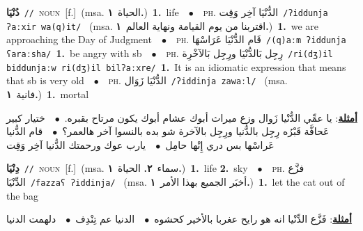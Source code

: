 \documentclass[10pt,a4paper,twoside]{article} %
\begin{document}
\begin{multicols}{2}
{\setlength\topsep{0pt}\textbf{\foreignlanguage{arabic}{دُنْيَا}}\ {\color{gray}\texttt{//}\color{black}}\ \textsc{noun}\ [f.]\ \color{gray}(msa. \foreignlanguage{arabic}{الحياة}~\foreignlanguage{arabic}{\textbf{١.}})\color{black}\ \textbf{1.}~life\ \ $\bullet$\ \ \textsc{ph.} \color{gray} \foreignlanguage{arabic}{الدُّنْيَا آخِر وَقِت}\color{black}\ {\color{gray}\texttt{/{\sffamily ʔiddunja ʔaːxir wa(q)it}/}\color{black}}\ \color{gray} (msa. \foreignlanguage{arabic}{اقتربنا من يوم القيامة ونهاية العالم}~\foreignlanguage{arabic}{\textbf{١.}})\color{black}\ \textbf{1.}~we are approaching the Day of Judgment\ \ $\bullet$\ \ \textsc{ph.} \color{gray} \foreignlanguage{arabic}{قَام الدُّنْيَا عَرَاسْهَا}\color{black}\ {\color{gray}\texttt{/{\sffamily (q)aːm ʔiddunja ʕaraːsha}/}\color{black}}\ \textbf{1.}~be angry with sb\ \ $\bullet$\ \ \textsc{ph.} \color{gray} \foreignlanguage{arabic}{رِجِل بَالدُّنْيَا ورِجِل بَالآخْرِة}\color{black}\ {\color{gray}\texttt{/{\sffamily ri(dʒ)il biddunjaːw ri(dʒ)il bilʔaːxre}/}\color{black}}\ \textbf{1.}~It is an idiomatic expression that means that sb is very old\ \ $\bullet$\ \ \textsc{ph.} \color{gray} \foreignlanguage{arabic}{الدُّنْيَا  زَوَال}\color{black}\ {\color{gray}\texttt{/{\sffamily ʔiddinja zawaːl}/}\color{black}}\ \color{gray} (msa. \foreignlanguage{arabic}{فانية}~\foreignlanguage{arabic}{\textbf{١.}})\color{black}\ \textbf{1.}~mortal\  \begin{flushright}\color{gray}\foreignlanguage{arabic}{\textbf{\underline{\foreignlanguage{arabic}{أمثلة}}}: يا عمِّي الدُّنْيا زَوال وزع ميراث أبوك عشام أبوك يكون مرتاح بقبره.\ $\bullet$\ \  ختيار كبير عَحافَّة قَبْرُه رِجِل بالدُّنيا ورِجِل بالآخرة شو بده بالنسوا آخر هالعمر؟\ $\bullet$\ \  قام الدُّنيا عَراسْها بس دري إِنْها حامِل\ $\bullet$\ \  يارب عوك ورحمتك الدُّنيا آخِر وَقِت}\end{flushright}\color{black}} \vspace{2mm}

{\setlength\topsep{0pt}\textbf{\foreignlanguage{arabic}{دِنْيَا}}\ {\color{gray}\texttt{//}\color{black}}\ \textsc{noun}\ [f.]\ \color{gray}(msa. \foreignlanguage{arabic}{سماء}~\foreignlanguage{arabic}{\textbf{٢.}}  \foreignlanguage{arabic}{الحياة}~\foreignlanguage{arabic}{\textbf{١.}})\color{black}\ \textbf{1.}~life  \textbf{2.}~sky\ \ $\bullet$\ \ \textsc{ph.} \color{gray} \foreignlanguage{arabic}{فزَّع الدِّنْيَا}\color{black}\ {\color{gray}\texttt{/{\sffamily fazzaʕ ʔiddinja}/}\color{black}}\ \color{gray} (msa. \foreignlanguage{arabic}{أخبَر الجميع بهذا الأمر}~\foreignlanguage{arabic}{\textbf{١.}})\color{black}\ \textbf{1.}~let the cat out of the bag\  \begin{flushright}\color{gray}\foreignlanguage{arabic}{\textbf{\underline{\foreignlanguage{arabic}{أمثلة}}}: فَزَّع الدِّنْيا انه هو رايح عغربا بالأخير كحشوه\ $\bullet$\ \  الدنيا عم تِنْدِف\ $\bullet$\ \  دلهمت الدنيا}\end{flushright}\color{black}} \vspace{2mm}


\end{multicols}
\end{document}
